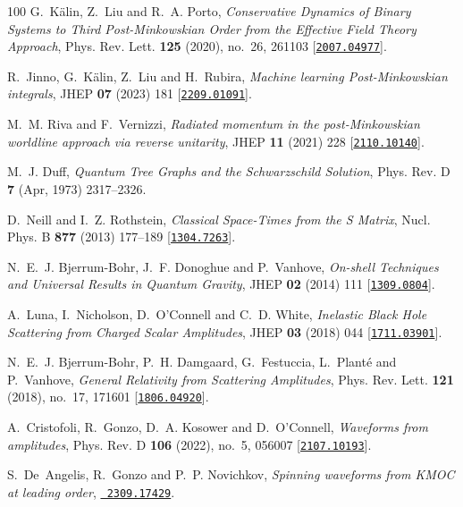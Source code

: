 \begin{thebibliography}{100}
G.~K\"alin, Z.~Liu and R.~A. Porto,  {\em {Conservative Dynamics of Binary
  Systems to Third Post-Minkowskian Order from the Effective Field Theory
  Approach}}, Phys. Rev. Lett. {\bf 125} (2020), no.~26, 261103
  [\href{http://www.arXiv.org/abs/2007.04977}{{\tt 2007.04977}}].

R.~Jinno, G.~K\"alin, Z.~Liu and H.~Rubira,  {\em {Machine learning
  Post-Minkowskian integrals}}, JHEP {\bf 07} (2023) 181
  [\href{http://www.arXiv.org/abs/2209.01091}{{\tt 2209.01091}}].

M.~M. Riva and F.~Vernizzi,  {\em {Radiated momentum in the post-Minkowskian
  worldline approach via reverse unitarity}}, JHEP {\bf 11} (2021) 228
  [\href{http://www.arXiv.org/abs/2110.10140}{{\tt 2110.10140}}].

M.~J. Duff,  {\em Quantum Tree Graphs and the Schwarzschild Solution}, Phys.
  Rev. D {\bf 7} (Apr, 1973) 2317--2326.

D.~Neill and I.~Z. Rothstein,  {\em {Classical Space-Times from the S Matrix}},
  Nucl. Phys. B {\bf 877} (2013) 177--189
  [\href{http://www.arXiv.org/abs/1304.7263}{{\tt 1304.7263}}].

N.~E.~J. Bjerrum-Bohr, J.~F. Donoghue and P.~Vanhove,  {\em {On-shell
  Techniques and Universal Results in Quantum Gravity}}, JHEP {\bf 02} (2014)
  111 [\href{http://www.arXiv.org/abs/1309.0804}{{\tt 1309.0804}}].

A.~Luna, I.~Nicholson, D.~O'Connell and C.~D. White,  {\em {Inelastic Black
  Hole Scattering from Charged Scalar Amplitudes}}, JHEP {\bf 03} (2018) 044
  [\href{http://www.arXiv.org/abs/1711.03901}{{\tt 1711.03901}}].

N.~E.~J. Bjerrum-Bohr, P.~H. Damgaard, G.~Festuccia, L.~Plant\'e and
  P.~Vanhove,  {\em {General Relativity from Scattering Amplitudes}}, Phys.
  Rev. Lett. {\bf 121} (2018), no.~17, 171601
  [\href{http://www.arXiv.org/abs/1806.04920}{{\tt 1806.04920}}].

A.~Cristofoli, R.~Gonzo, D.~A. Kosower and D.~O'Connell,  {\em {Waveforms from
  amplitudes}}, Phys. Rev. D {\bf 106} (2022), no.~5, 056007
  [\href{http://www.arXiv.org/abs/2107.10193}{{\tt 2107.10193}}].

S.~De~Angelis, R.~Gonzo and P.~P. Novichkov,  {\em {Spinning waveforms from
  KMOC at leading order}}, \href{http://www.arXiv.org/abs/2309.17429}{{\tt
  2309.17429}}.


\end{thebibliography}
